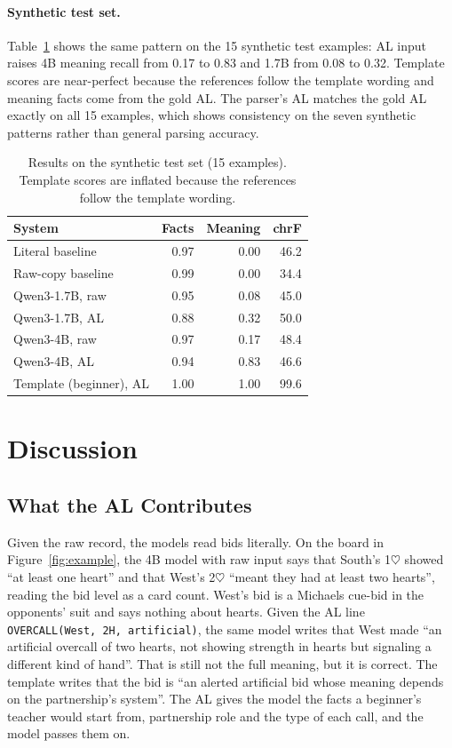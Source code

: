 \documentclass[11pt]{article}
\newcommand{\suitH}{$\heartsuit$}
\begin{document}
\paragraph{Synthetic test set.} Table~\ref{tab:synth} shows the same pattern on the 15 synthetic test examples: AL input raises 4B meaning recall from 0.17 to 0.83 and 1.7B from 0.08 to 0.32. Template scores are near-perfect because the references follow the template wording and meaning facts come from the gold AL. The parser's AL matches the gold AL exactly on all 15 examples, which shows consistency on the seven synthetic patterns rather than general parsing accuracy.

\begin{table}[t]
\centering
\small
\begin{tabular}{lrrr}
\toprule
System & Facts & Meaning & chrF \\
\midrule
Literal baseline & 0.97 & 0.00 & 46.2 \\
Raw-copy baseline & 0.99 & 0.00 & 34.4 \\
Qwen3-1.7B, raw & 0.95 & 0.08 & 45.0 \\
Qwen3-1.7B, AL & 0.88 & 0.32 & 50.0 \\
Qwen3-4B, raw & 0.97 & 0.17 & 48.4 \\
Qwen3-4B, AL & 0.94 & 0.83 & 46.6 \\
Template (beginner), AL & 1.00 & 1.00 & 99.6 \\
\bottomrule
\end{tabular}
\caption{Results on the synthetic test set (15 examples). Template scores are inflated because the references follow the template wording.}
\label{tab:synth}
\end{table}

\section{Discussion}
\label{sec:discussion}

\subsection{What the AL Contributes}

Given the raw record, the models read bids literally. On the board in Figure~\ref{fig:example}, the 4B model with raw input says that South's 1\suitH{} showed ``at least one heart'' and that West's 2\suitH{} ``meant they had at least two hearts'', reading the bid level as a card count. West's bid is a Michaels cue-bid in the opponents' suit and says nothing about hearts. Given the AL line \texttt{OVERCALL(West, 2H, artificial)}, the same model writes that West made ``an artificial overcall of two hearts, not showing strength in hearts but signaling a different kind of hand''. That is still not the full meaning, but it is correct. The template writes that the bid is ``an alerted artificial bid whose meaning depends on the partnership's system''. The AL gives the model the facts a beginner's teacher would start from, partnership role and the type of each call, and the model passes them on.
\end{document}

